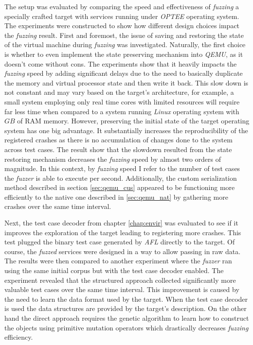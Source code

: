 The setup was evaluated by comparing the speed and effectiveness of \textit{fuzzing} a specially crafted target with services running under \textit{OPTEE} operating system. The experiments were constructed to show how different design choices impact the \textit{fuzzing} result. First and foremost, the issue of saving and restoring the state of the virtual machine during \textit{fuzzing} was investigated. Naturally, the first choice is whether to even implement the state preserving mechanism into \textit{QEMU}, as it doesn't come without cons. The experiments show that it heavily impacts the \textit{fuzzing} speed by adding significant delays due to the need to basically duplicate the memory and virtual processor state and then write it back. This slow down is not constant and may vary based on the target's architecture, for example, a small system employing only real time cores with limited resources will require far less time when compared to a system running \textit{Linux} operating system with $GB$ of RAM memory. However, preserving the initial state of the target operating system has one big advantage. It substantially increases the reproducibility of the registered crashes as there is no accumulation of changes done to the system across test cases. The result show that the slowdown resulted from the state restoring mechanism decreases the \textit{fuzzing} speed by almost two orders of magnitude. In this context, by \textit{fuzzing} speed I refer to the number of test cases the \textit{fuzzer} is able to execute per second. Additionally, the custom serialization method described in section \ref{sec:qemu_cus} appeared to be functioning more efficiently to the native one described in \ref{sec:qemu_nat} by gathering more crashes over the same time interval.

Next, the test case decoder from chapter \ref{chap:envir} was evaluated to see if it improves the exploration of the target leading to registering more crashes. This test plugged the binary test case generated by \textit{AFL} directly to the target. Of course, the \textit{fuzzed} services were designed in a way to allow passing in raw data. The results were then compared to another experiment where the \textit{fuzzer} ran using the same initial corpus but with the test case decoder enabled. The experiment revealed that the structured approach collected significantly more valuable test cases over the same time interval. This improvement is caused by the need to learn the data format used by the target. When the test case decoder is used the data structures are provided by the target's description. On the other hand the direct approach requires the genetic algorithm to learn how to construct the objects using primitive mutation operators which drastically decreases \textit{fuzzing} efficiency.

